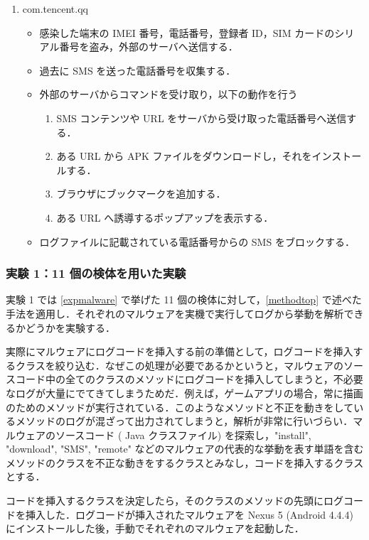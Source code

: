 \begin{enumerate}
\item com.tencent.qq
	\begin{itemize}
	\item 感染した端末の IMEI 番号，電話番号，登録者 ID，SIM カードのシリアル番号を盗み，外部のサーバへ送信する．
	\item 過去に SMS を送った電話番号を収集する．
	\item 外部のサーバからコマンドを受け取り，以下の動作を行う
	\begin{enumerate}
		\item SMS コンテンツや URL をサーバから受け取った電話番号へ送信する．
		\item ある URL から APK ファイルをダウンロードし，それをインストールする．
		\item ブラウザにブックマークを追加する．
		\item ある URL へ誘導するポップアップを表示する．
	\end{enumerate}
	\item ログファイルに記載されている電話番号からの SMS をブロックする．
	\end{itemize}
\end{enumerate}

\subsubsection{実験 1：11 個の検体を用いた実験}
\label{exp1}
実験 1 では \ref{expmalware} で挙げた 11 個の検体に対して，\ref{methodtop} で述べた手法を適用し．それぞれのマルウェアを実機で実行してログから挙動を解析できるかどうかを実験する．

実際にマルウェアにログコードを挿入する前の準備として，ログコードを挿入するクラスを絞り込む．なぜこの処理が必要であるかというと，マルウェアのソースコード中の全てのクラスのメソッドにログコードを挿入してしまうと，不必要なログが大量にでてきてしまうためだ．例えば，ゲームアプリの場合，常に描画のためのメソッドが実行されている．このようなメソッドと不正を動きをしているメソッドのログが混ざって出力されてしまうと，解析が非常に行いづらい．マルウェアのソースコード ( Java クラスファイル) を探索し，"install", "download", "SMS", "remote" などのマルウェアの代表的な挙動を表す単語を含むメソッドのクラスを不正な動きをするクラスとみなし，コードを挿入するクラスとする．

コードを挿入するクラスを決定したら，そのクラスのメソッドの先頭にログコードを挿入した．ログコードが挿入されたマルウェアを Nexus 5 (Android 4.4.4) にインストールした後，手動でそれぞれのマルウェアを起動した．

